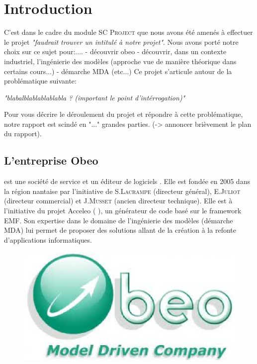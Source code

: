 \chapter{Introduction}\label{chap:Intro}
C'est dans le cadre du module \textsc{SC Project} que nous avons été amenés à effectuer le projet \textit{"faudrait trouver un intitulé à notre projet"}. 
\newline
Nous avons porté notre choix sur ce sujet pour:....
- découvrir obeo 
- découvrir, dans un contexte industriel, l'ingénierie des modèles (approche vue de manière théorique dans certains cours...)
- démarche MDA
\newline
(etc...)
\newline
Ce projet s'articule autour de la problématique suivante:
\begin {center}
\textit{"blabalblablablablabla ? (important le point d'intérrogation)"}
\end{center}
Pour vous décrire le déroulement du projet et répondre à cette problématique, notre rapport est scindé en "..." grandes parties. (-> annoncer brièvement le plan du rapport).


\section{L'entreprise Obeo}
\kwobeo{} est une société de service et un éditeur de logiciels \cite{obeo}.  Elle est fondée en 2005 dans la région nantaise par l'initiative de S.\textsc{Lacrampe} (directeur général), E.\textsc{Juliot} (directeur commercial) et J.\textsc{Musset} (ancien directeur technique). Elle est à l'initiative du projet Acceleo (\cf{} \cite{acceleo}), un générateur de code basé sur le framework EMF. Son expertise dans le domaine de l'ingénierie des modèles (démarche MDA) lui permet de proposer des solutions allant de la création à la refonte d'applications informatiques. 

\begin{figure}[htb]
  \centering
  \includegraphics[scale=.4]{img/logoobeo.eps}
  \label{fig:obeo}
\end{figure}

